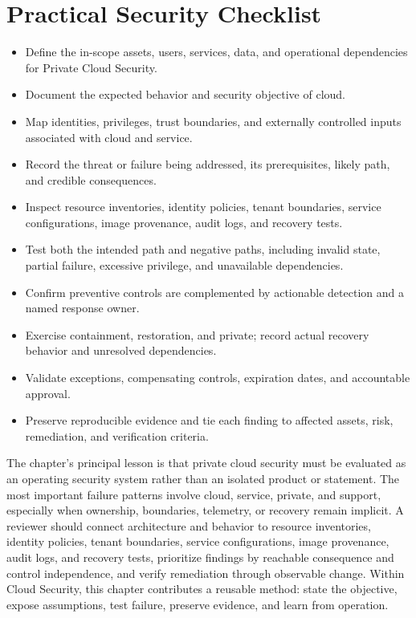 \documentclass[11pt]{article}
\begin{document}
\section*{Practical Security Checklist}
\begin{itemize}[label=$\square$]
\item Define the in-scope assets, users, services, data, and operational dependencies for Private Cloud Security.
\item Document the expected behavior and security objective of cloud.
\item Map identities, privileges, trust boundaries, and externally controlled inputs associated with cloud and service.
\item Record the threat or failure being addressed, its prerequisites, likely path, and credible consequences.
\item Inspect resource inventories, identity policies, tenant boundaries, service configurations, image provenance, audit logs, and recovery tests.
\item Test both the intended path and negative paths, including invalid state, partial failure, excessive privilege, and unavailable dependencies.
\item Confirm preventive controls are complemented by actionable detection and a named response owner.
\item Exercise containment, restoration, and private; record actual recovery behavior and unresolved dependencies.
\item Validate exceptions, compensating controls, expiration dates, and accountable approval.
\item Preserve reproducible evidence and tie each finding to affected assets, risk, remediation, and verification criteria.
\end{itemize}
\begin{synthesisbox}
The chapter's principal lesson is that private cloud security must be evaluated as an operating security system rather than an isolated product or statement. The most important failure patterns involve cloud, service, private, and support, especially when ownership, boundaries, telemetry, or recovery remain implicit. A reviewer should connect architecture and behavior to resource inventories, identity policies, tenant boundaries, service configurations, image provenance, audit logs, and recovery tests, prioritize findings by reachable consequence and control independence, and verify remediation through observable change. Within Cloud Security, this chapter contributes a reusable method: state the objective, expose assumptions, test failure, preserve evidence, and learn from operation.
\end{synthesisbox}
\end{document}
